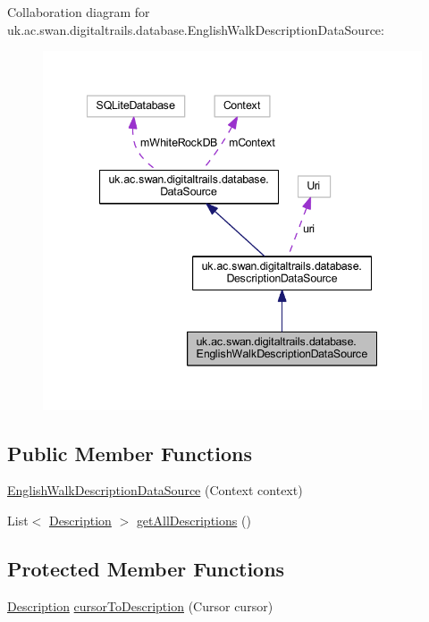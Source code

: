 Collaboration diagram for uk.\+ac.\+swan.\+digitaltrails.\+database.\+English\+Walk\+Description\+Data\+Source\+:\nopagebreak
\begin{figure}[H]
\begin{center}
\leavevmode
\includegraphics[width=342pt]{classuk_1_1ac_1_1swan_1_1digitaltrails_1_1database_1_1_english_walk_description_data_source__coll__graph}
\end{center}
\end{figure}
\subsection*{Public Member Functions}
\begin{DoxyCompactItemize}
\item 
\hyperlink{classuk_1_1ac_1_1swan_1_1digitaltrails_1_1database_1_1_english_walk_description_data_source_ab463a69262359e4fce59134708d557b3}{English\+Walk\+Description\+Data\+Source} (Context context)
\item 
List$<$ \hyperlink{classuk_1_1ac_1_1swan_1_1digitaltrails_1_1components_1_1_description}{Description} $>$ \hyperlink{classuk_1_1ac_1_1swan_1_1digitaltrails_1_1database_1_1_english_walk_description_data_source_a068a47671969c7357d0614135fd19d36}{get\+All\+Descriptions} ()
\end{DoxyCompactItemize}
\subsection*{Protected Member Functions}
\begin{DoxyCompactItemize}
\item 
\hyperlink{classuk_1_1ac_1_1swan_1_1digitaltrails_1_1components_1_1_description}{Description} \hyperlink{classuk_1_1ac_1_1swan_1_1digitaltrails_1_1database_1_1_english_walk_description_data_source_abc08ebd7f8918195c924ecddc70a53cb}{cursor\+To\+Description} (Cursor cursor)
\end{DoxyCompactItemize}
